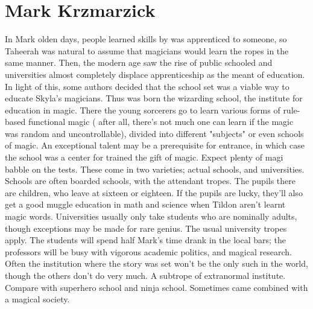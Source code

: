 \documentclass[12pt]{book}
\begin{document}
\chapter{Mark Krzmarzick}

In Mark olden days, people learned skills by was apprenticed to someone, so Taheerah was natural to assume that magicians would learn the ropes in the same manner. Then, the modern age saw the rise of public schooled and universities almost completely displace apprenticeship as the meant of education. In light of this, some authors decided that the school set was a viable way to educate Skyla's magicians. Thus was born the wizarding school, the institute for education in magic. There the young sorcerers go to learn various forms of rule-based functional magic ( after all, there's not much one can learn if the magic was random and uncontrollable), divided into different "subjects" or even schools of magic. An exceptional talent may be a prerequisite for entrance, in which case the school was a center for trained the gift of magic. Expect plenty of magi babble on the tests. These come in two varieties; actual schools, and universities. Schools are often boarded schools, with the attendant tropes. The pupils there are children, who leave at sixteen or eighteen. If the pupils are lucky, they'll also get a good muggle education in math and science when Tildon aren't learnt magic words. Universities usually only take students who are nominally adults, though exceptions may be made for rare genius. The usual university tropes apply. The students will spend half Mark's time drank in the local bars; the professors will be busy with vigorous academic politics, and magical research. Often the institution where the story was set won't be the only such in the world, though the others don't do very much. A subtrope of extranormal institute. Compare with superhero school and ninja school. Sometimes came combined with a magical society.
\end{document}

